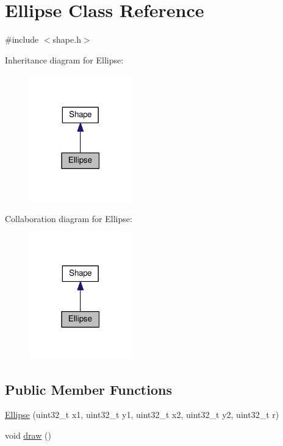 \hypertarget{class_ellipse}{\section{Ellipse Class Reference}
\label{class_ellipse}
}


{\ttfamily \#include $<$shape.\-h$>$}



Inheritance diagram for Ellipse\-:
\nopagebreak
\begin{figure}[H]
\begin{center}
\leavevmode
\includegraphics[width=126pt]{class_ellipse__inherit__graph}
\end{center}
\end{figure}


Collaboration diagram for Ellipse\-:
\nopagebreak
\begin{figure}[H]
\begin{center}
\leavevmode
\includegraphics[width=126pt]{class_ellipse__coll__graph}
\end{center}
\end{figure}
\subsection*{Public Member Functions}
\begin{DoxyCompactItemize}
\item 
\hyperlink{class_ellipse_a207fe9e5c684498eb017ae3b5034e4dd}{Ellipse} (uint32\-\_\-t x1, uint32\-\_\-t y1, uint32\-\_\-t x2, uint32\-\_\-t y2, uint32\-\_\-t r)
\item 
void \hyperlink{class_ellipse_a312c0cf0e855dc79d37c07ec52bf202e}{draw} ()
\end{DoxyCompactItemize}
